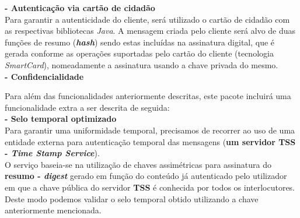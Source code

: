 \documentclass[times, 10pt,twocolumn]{article}
\begin{document}
\noindent \textbf{- Autentica\c{c}\~ao via cart\~ao de cidad\~ao}\\
\indent Para garantir a autenticidade do cliente, ser\'a utilizado o cart\~ao de cidad\~ao com as respectivas bibliotecas \emph{Java}. A mensagem criada pelo cliente ser\'a alvo de duas fun\c{c}\~oes de resumo (\textbf{\emph{hash}}) sendo estas inclu\'idas na assinatura digital, que \'e gerada conforme as opera\c{c}\~oes suportadas pelo cart\~ao do cliente (tecnologia \emph{SmartCard}), nomeadamente a assinatura usando a chave privada do mesmo. \\

\noindent \textbf{- Confidencialidade}\\



Para al\'em das funcionalidades anteriormente descritas, este pacote incluir\'a uma funcionalidade extra a ser descrita de seguida:\\

\noindent \textbf{- Selo temporal optimizado}\\
\indent Para garantir uma uniformidade temporal, precisamos de recorrer ao uso de uma entidade externa para autentica\c{c}\~ao temporal das mensagens (\textbf{um servidor TSS - \emph{Time Stamp Service}}). \\
\indent O servi\c{c}o baseia-se na utiliza\c{c}\~ao de chaves assim\'etricas para assinatura do \textbf{resumo - \emph{digest}} gerado em fun\c{c}\~ao do conte\'udo j\'a autenticado pelo utilizador em que a chave p\'ublica do servidor \textbf{TSS} \'e conhecida por todos os interlocutores. Deste modo podemos validar o selo temporal obtido utilizando a chave anteriormente mencionada.

\end{document}
